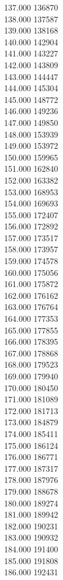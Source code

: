 { 137.000	136870 \\
 138.000	137587 \\
 139.000	138168 \\
 140.000	142904 \\
 141.000	143227 \\
 142.000	143809 \\
 143.000	144447 \\
 144.000	145304 \\
 145.000	148772 \\
 146.000	149236 \\
 147.000	149850 \\
 148.000	153939 \\
 149.000	153972 \\
 150.000	159965 \\
 151.000	162840 \\
 152.000	163382 \\
 153.000	168953 \\
 154.000	169693 \\
 155.000	172407 \\
 156.000	172892 \\
 157.000	173517 \\
 158.000	173957 \\
 159.000	174578 \\
 160.000	175056 \\
 161.000	175872 \\
 162.000	176162 \\
 163.000	176764 \\
 164.000	177353 \\
 165.000	177855 \\
 166.000	178395 \\
 167.000	178868 \\
 168.000	179523 \\
 169.000	179940 \\
 170.000	180450 \\
 171.000	181089 \\
 172.000	181713 \\
 173.000	184879 \\
 174.000	185411 \\
 175.000	186124 \\
 176.000	186771 \\
 177.000	187317 \\
 178.000	187976 \\
 179.000	188678 \\
 180.000	189274 \\
 181.000	189942 \\
 182.000	190231 \\
 183.000	190932 \\
 184.000	191400 \\
 185.000	191808 \\
 186.000	192431 \\
}
